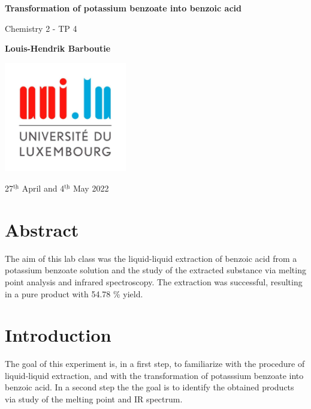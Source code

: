 \documentclass{article}
\begin{document}
\begin{titlepage}
    \begin{center}
        \vspace*{1cm}
        \Huge
        \textbf{Transformation of potassium benzoate into benzoic acid}
        
        \vspace{0.5cm}
        \LARGE
        Chemistry 2 - TP 4
        
        \vspace{1.5cm}
        \textbf{Louis-Hendrik Barboutie}
        
        
        \vfill
        
        \includegraphics[width=0.4\textwidth]{logo_uni.jpg}
        
        \Large
        27$^{\underline{\text{th}}}$ April and 4$^{\underline{\text{th}}}$ May 2022
    \end{center}
\end{titlepage}

\section{Abstract}

The aim of this lab class was the liquid-liquid extraction of benzoic acid from a potassium benzoate solution and the study of the extracted substance via melting point analysis and infrared spectroscopy. The extraction was successful, resulting in a pure product with 54.78 \% yield.

\section{Introduction}

The goal of this experiment is, in a first step, to familiarize with the procedure of liquid-liquid extraction, and with the transformation of potasssium benzoate into benzoic acid. In a second step the the goal is to identify the obtained products via study of the melting point and IR spectrum.
\end{document}
